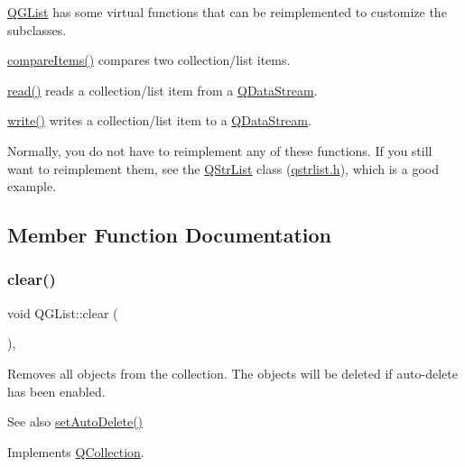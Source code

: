 \mbox{\hyperlink{class_q_g_list}{Q\+G\+List}} has some virtual functions that can be reimplemented to customize the subclasses. 
\begin{DoxyItemize}
\item \mbox{\hyperlink{class_q_g_list_a9a9c5fa3888371979c12e3207b3f9ec5}{compare\+Items()}} compares two collection/list items. 
\item \mbox{\hyperlink{structcmd_8h_a9c7b76d5266903891c803132d51ccb90}{read()}} reads a collection/list item from a \mbox{\hyperlink{class_q_data_stream}{Q\+Data\+Stream}}. 
\item \mbox{\hyperlink{structcmd_8h_af2a3ea719b83f672637febdd87c36c36}{write()}} writes a collection/list item to a \mbox{\hyperlink{class_q_data_stream}{Q\+Data\+Stream}}. 
\end{DoxyItemize}Normally, you do not have to reimplement any of these functions. If you still want to reimplement them, see the \mbox{\hyperlink{class_q_str_list}{Q\+Str\+List}} class (\mbox{\hyperlink{qstrlist_8h_source}{qstrlist.\+h}}), which is a good example. 

\subsection{Member Function Documentation}
\mbox{\label{class_q_g_list_a9b89540497bfcf674466dcf9e343d981}} 
\subsubsection{\texorpdfstring{clear()}{clear()}}
{\footnotesize\ttfamily void Q\+G\+List\+::clear (\begin{DoxyParamCaption}{ }\end{DoxyParamCaption})\hspace{0.3cm}{\ttfamily [protected]}, {\ttfamily [virtual]}}

Removes all objects from the collection. The objects will be deleted if auto-\/delete has been enabled. \begin{DoxySeeAlso}{See also}
\mbox{\hyperlink{class_q_collection_a6ed41913c76bfba54be6da26015ee3f3}{set\+Auto\+Delete()}} 
\end{DoxySeeAlso}


Implements \mbox{\hyperlink{class_q_collection_a92416cc22907550389aad04c26be2f77}{Q\+Collection}}.



